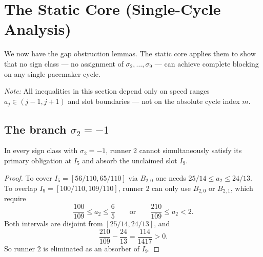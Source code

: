 \documentclass[12pt]{article}
\begin{document}
\section{The Static Core (Single-Cycle Analysis)}

We now have the gap obstruction lemmas. The static core applies them to show that no sign
class — no assignment of $\sigma_2,\ldots,\sigma_9$ — can achieve complete blocking on any
single pacemaker cycle.

\noindent\emph{Note:} All inequalities in this section depend only on speed ranges $a_j\in(j-1,j+1)$ and slot boundaries — not on the absolute cycle index $m$.

\subsection{The branch \texorpdfstring{$\sigma_2=-1$}{sigma\_2 = -1}}

\begin{lemma}\label{l:61}
In every sign class with $\sigma_2=-1$,
runner 2 cannot simultaneously satisfy its primary obligation at $I_5$ and absorb the
unclaimed slot $I_9$.

\end{lemma}
\begin{proof}
To cover $I_5=[56/110,65/110]$ via $B_{2,0}$ one needs $25/14\le a_2\le 24/13$.
To overlap $I_9=[100/110,109/110]$, runner 2 can only use $B_{2,0}$ or $B_{2,1}$,
which require
\[
\frac{100}{109}\le a_2\le \frac{6}{5}\qquad\text{or}\qquad
  \frac{210}{109}\le a_2<2.
\]
Both intervals are disjoint from $[25/14,24/13]$, and
\[
\frac{210}{109}-\frac{24}{13}=\frac{114}{1417}>0.
\]
So runner 2 is eliminated as an absorber of $I_9$.
\end{proof}
\end{document}

